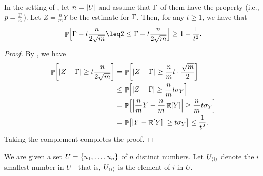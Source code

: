 \begin{lemma}
    In the setting of , let $n= \left| {U} \right|$ and
    assume that $\Gamma$ of them have the property (i.e.,
    $p=\tfrac{\Gamma}{n}$). Let $Z = \tfrac{n}{m}Y$ be the estimate for
    $\Gamma$.  Then, for any $t\geq 1$, we have that
    \begin{equation*}
        \Prob{ \Bigl. \smash{\numC - t \frac{n}{2\sqrt{m}}%
              \leq%
              Z%
              \leq%
              \numC + t \frac{n}{2\sqrt{m}} } }%
        \geq%
        1- \frac{1}{t^2}.
    \end{equation*}
\end{lemma}
\begin{proof}
    By , we have
    \begin{align*}
        \Prob{\bigl. \cardin{Z - \numC } \geq t \frac{n}{2\sqrt{m}} }%
        &=
        \Prob{\bigl. \cardin{Z - \numC } \geq
           \frac{n}{m}t \cdot \frac{\sqrt{m}}{2} }%
        \\&
        \leq
        \Prob{\bigl. \cardin{Z - \numC } \geq
           \frac{n}{m}t \sigma_Y }%
        \\&
        =
        \Prob{\bigl. \cardin{\frac{n}{m}Y - \frac{n}{m} \Ex{Y} } \geq
           \frac{n}{m}t \sigma_Y }%
        \\&%
        =%
        \Prob{\bigl. \cardin{Y - \Ex{Y} } \geq t \sigma_Y }%
        \leq
        \frac{1}{t^2}.
    \end{align*}
    Taking the complement completes the proof.
\end{proof}






We are given a set $U = \left\{ {u_1,\ldots, u_n} \right\}$ of $n$ distinct numbers. Let
$U_{\langle i\rangle}$ denote the $i$\th smallest number in $U$---that is,
$U_{\langle i\rangle}$ is the element of  $i$ in $U$.

